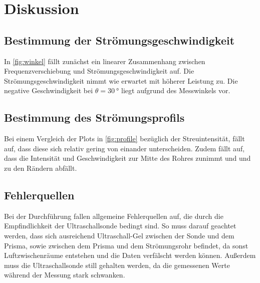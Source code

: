 \section{Diskussion}
\label{sec:Diskussion}

\subsection{Bestimmung der Strömungsgeschwindigkeit}

In \autoref{fig:winkel} fällt zunächst ein linearer Zusammenhang zwischen Frequenzverschiebung und Strömungsgeschwindigkeit auf.
Die Strömungsgeschwindigkeit nimmt wie erwartet mit höherer Leistung zu.
Die negative Geschwindigkeit bei $\theta = \qty{30}{°}$ liegt aufgrund des Messwinkels vor.


\subsection{Bestimmung des Strömungsprofils}

Bei einem Vergleich der Plots in \autoref{fig:profile} bezüglich der Streuintensität, fällt auf,
dass diese sich relativ gering von einander unterscheiden. Zudem fällt auf, dass die
Intensität und Geschwindigkeit zur Mitte des Rohres zunimmt und und zu den Rändern
abfällt.

\subsection{Fehlerquellen}

Bei der Durchführung fallen allgemeine Fehlerquellen auf, die durch die Empfindlichkeit der Ultraschallsonde bedingt sind.
So muss darauf geachtet werden, dass sich ausreichend Ultraschall-Gel zwischen der Sonde und dem Prisma, 
sowie zwischen dem Prisma und dem Strömungsrohr befindet, da sonst Luftzwischenräume entstehen und die Daten verfälscht werden können.
Außerdem muss die Ultraschallsonde still gehalten werden, da die gemessenen Werte während der Messung stark schwanken.